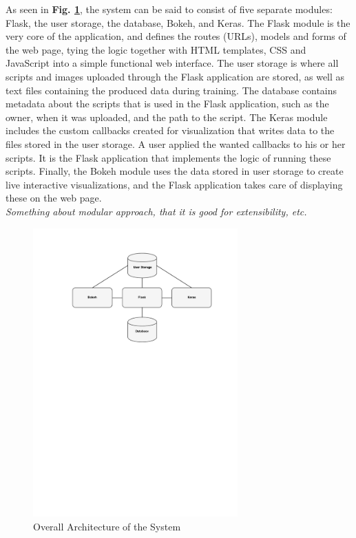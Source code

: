As seen in \textbf{Fig. \ref{architecture1}}, the system can be said to consist of five separate modules: Flask, the user storage, the database, Bokeh, and Keras. The Flask module is the very core of the application, and defines the routes (URLs), models and forms of the web page, tying the logic together with HTML templates, CSS and JavaScript into a simple functional web interface. The user storage is where all scripts and images uploaded through the Flask application are stored, as well as text files containing the produced data during training. The database contains metadata about the scripts that is used in the Flask application, such as the owner, when it was uploaded, and the path to the script. The Keras module includes the custom callbacks created for visualization that writes data to the files stored in the user storage. A user applied the wanted callbacks to his or her scripts. It is the Flask application that implements the logic of running these scripts. Finally, the Bokeh module uses the data stored in user storage to create live interactive visualizations, and the Flask application takes care of displaying these on the web page. \\

\noindent \textit{Something about modular approach, that it is good for extensibility, etc.}



\begin{figure}[h!]
    \centering
        \includegraphics[width=0.7\textwidth]{fig/overall-architecture.pdf}
        \caption{Overall Architecture of the System}
        \label{architecture1}
\end{figure}

